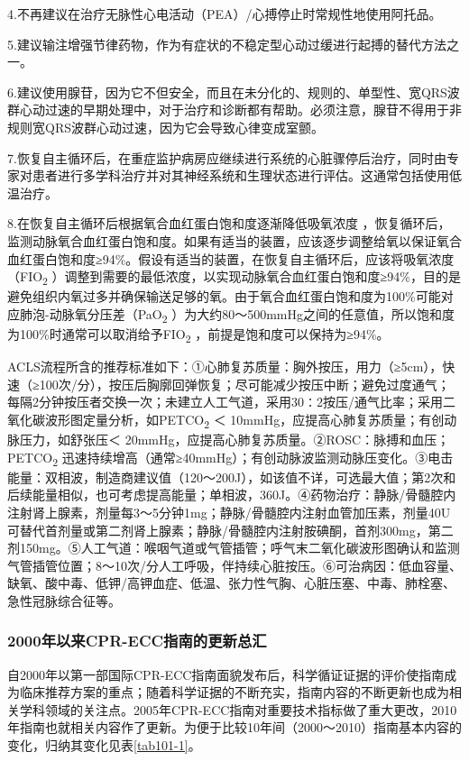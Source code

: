 4.不再建议在治疗无脉性心电活动（PEA）/心搏停止时常规性地使用阿托品。

5.建议输注增强节律药物，作为有症状的不稳定型心动过缓进行起搏的替代方法之一。

6.建议使用腺苷，因为它不但安全，而且在未分化的、规则的、单型性、宽QRS波群心动过速的早期处理中，对于治疗和诊断都有帮助。必须注意，腺苷不得用于非规则宽QRS波群心动过速，因为它会导致心律变成室颤。

7.恢复自主循环后，在重症监护病房应继续进行系统的心脏骤停后治疗，同时由专家对患者进行多学科治疗并对其神经系统和生理状态进行评估。这通常包括使用低温治疗。

8.在恢复自主循环后根据氧合血红蛋白饱和度逐渐降低吸氧浓度
，恢复循环后，监测动脉氧合血红蛋白饱和度。如果有适当的装置，应该逐步调整给氧以保证氧合血红蛋白饱和度≥94\%。假设有适当的装置，在恢复自主循环后，应该将吸氧浓度（FIO\textsubscript{2}
）调整到需要的最低浓度，以实现动脉氧合血红蛋白饱和度≥94\%，目的是避免组织内氧过多并确保输送足够的氧。由于氧合血红蛋白饱和度为100\%可能对应肺泡-动脉氧分压差（PaO\textsubscript{2}
）为大约80～500mmHg之间的任意值，所以饱和度为100\%时通常可以取消给予FIO\textsubscript{2}
，前提是饱和度可以保持为≥94\%。

ACLS流程所含的推荐标准如下：①心肺复苏质量：胸外按压，用力（≥5cm），快速（≥100次/分），按压后胸廓回弹恢复；尽可能减少按压中断；避免过度通气；每隔2分钟按压者交换一次；未建立人工气道，采用30∶2按压/通气比率；采用二氧化碳波形图定量分析，如PETCO\textsubscript{2}
＜ 10mmHg，应提高心肺复苏质量；有创动脉压力，如舒张压＜
20mmHg，应提高心肺复苏质量。②ROSC：脉搏和血压；PETCO\textsubscript{2}
迅速持续增高（通常≥40mmHg）；有创动脉波监测动脉压变化。③电击能量：双相波，制造商建议值（120～200J），如该值不详，可选最大值；第2次和后续能量相似，也可考虑提高能量；单相波，360J。④药物治疗：静脉/骨髓腔内注射肾上腺素，剂量每3～5分钟1mg；静脉/骨髓腔内注射血管加压素，剂量40U可替代首剂量或第二剂肾上腺素；静脉/骨髓腔内注射胺碘酮，首剂300mg，第二剂150mg。⑤人工气道：喉咽气道或气管插管；呼气末二氧化碳波形图确认和监测气管插管位置；8～10次/分人工呼吸，伴持续心脏按压。⑥可治病因：低血容量、缺氧、酸中毒、低钾/高钾血症、低温、张力性气胸、心脏压塞、中毒、肺栓塞、急性冠脉综合征等。

\subsubsection{2000年以来CPR-ECC指南的更新总汇}

自2000年以第一部国际CPR-ECC指南面貌发布后，科学循证证据的评价使指南成为临床推荐方案的重点；随着科学证据的不断充实，指南内容的不断更新也成为相关学科领域的关注点。2005年CPR-ECC指南对重要技术指标做了重大更改，2010年指南也就相关内容作了更新。为便于比较10年间（2000～2010）指南基本内容的变化，归纳其变化见表\ref{tab101-1}。

